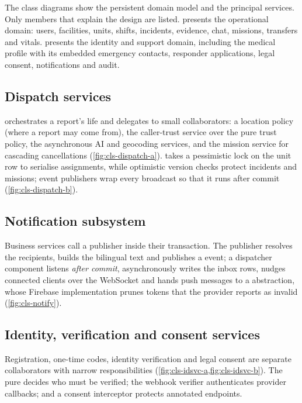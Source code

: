 The class diagrams show the persistent domain model and the principal services. Only members that explain the design
are listed.  presents the operational domain: users, facilities, units, shifts, incidents, evidence,
chat, missions, transfers and vitals.  presents the identity and support domain, including the
medical profile with its embedded emergency contacts, responder applications, legal consent, notifications and audit.


\subsection{Dispatch services}
 orchestrates a report's life and delegates to small collaborators: a location policy
(where a report may come from), the caller-trust service over the pure trust policy, the asynchronous AI and
geocoding services, and the mission service for cascading cancellations (\cref{fig:cls-dispatch-a}).
 takes a pessimistic lock on the unit row to serialise assignments, while optimistic version
checks protect incidents and missions; event publishers wrap every broadcast so that it runs after commit
(\cref{fig:cls-dispatch-b}).


\subsection{Notification subsystem}
Business services call a publisher inside their transaction. The publisher resolves the recipients, builds the
bilingual text and publishes a  event; a dispatcher component listens \emph{after commit},
asynchronously writes the inbox rows, nudges connected clients over the WebSocket and hands push messages to a
 abstraction, whose Firebase implementation prunes tokens that the provider reports as invalid
(\cref{fig:cls-notify}).


\subsection{Identity, verification and consent services}
Registration, one-time codes, identity verification and legal consent are separate collaborators with narrow
responsibilities (\cref{fig:cls-idsvc-a,fig:cls-idsvc-b}). The pure  decides who must be verified;
the webhook verifier authenticates provider callbacks; and a consent interceptor protects annotated endpoints.

